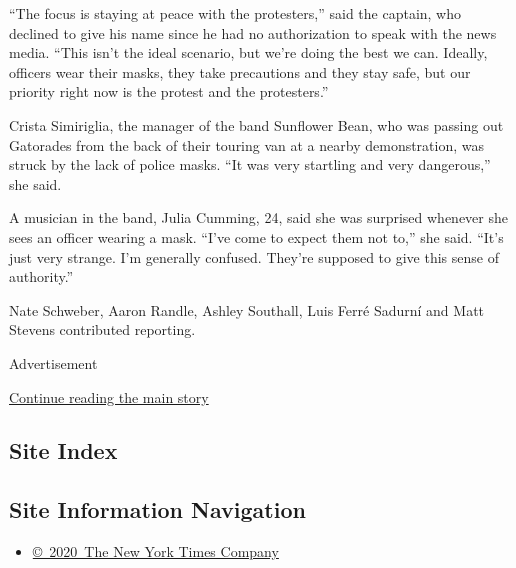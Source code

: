 ``The focus is staying at peace with the protesters,'' said the captain,
who declined to give his name since he had no authorization to speak
with the news media. ``This isn't the ideal scenario, but we're doing
the best we can. Ideally, officers wear their masks, they take
precautions and they stay safe, but our priority right now is the
protest and the protesters.''

Crista Simiriglia, the manager of the band Sunflower Bean, who was
passing out Gatorades from the back of their touring van at a nearby
demonstration, was struck by the lack of police masks. ``It was very
startling and very dangerous,'' she said.

A musician in the band, Julia Cumming, 24, said she was surprised
whenever she sees an officer wearing a mask. ``I've come to expect them
not to,'' she said. ``It's just very strange. I'm generally confused.
They're supposed to give this sense of authority.''

Nate Schweber, Aaron Randle, Ashley Southall, Luis Ferré Sadurní and
Matt Stevens contributed reporting.

Advertisement

\protect\hyperlink{after-bottom}{Continue reading the main story}

\hypertarget{site-index}{%
\subsection{Site Index}\label{site-index}}

\hypertarget{site-information-navigation}{%
\subsection{Site Information
Navigation}\label{site-information-navigation}}

\begin{itemize}
\tightlist
\item
  \href{https://help.nytimes3xbfgragh.onion/hc/en-us/articles/115014792127-Copyright-notice}{©~2020~The
  New York Times Company}
\end{itemize}

